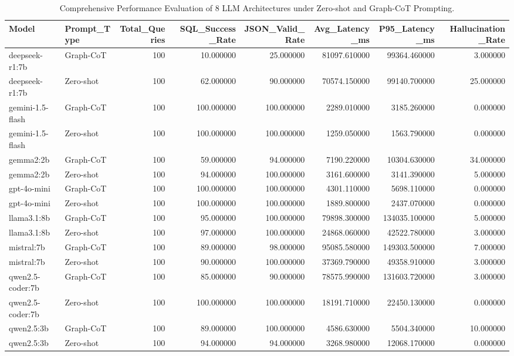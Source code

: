 \begin{table}
\caption{Comprehensive Performance Evaluation of 8 LLM Architectures under Zero-shot and Graph-CoT Prompting.}
\label{tab:llm_benchmark_all}
\begin{tabular}{llrrrrrr}
\toprule
Model & Prompt_Type & Total_Queries & SQL_Success_Rate & JSON_Valid_Rate & Avg_Latency_ms & P95_Latency_ms & Hallucination_Rate \\
\midrule
deepseek-r1:7b & Graph-CoT & 100 & 10.000000 & 25.000000 & 81097.610000 & 99364.460000 & 3.000000 \\
deepseek-r1:7b & Zero-shot & 100 & 62.000000 & 90.000000 & 70574.150000 & 99140.700000 & 25.000000 \\
gemini-1.5-flash & Graph-CoT & 100 & 100.000000 & 100.000000 & 2289.010000 & 3185.260000 & 0.000000 \\
gemini-1.5-flash & Zero-shot & 100 & 100.000000 & 100.000000 & 1259.050000 & 1563.790000 & 0.000000 \\
gemma2:2b & Graph-CoT & 100 & 59.000000 & 94.000000 & 7190.220000 & 10304.630000 & 34.000000 \\
gemma2:2b & Zero-shot & 100 & 94.000000 & 100.000000 & 3161.600000 & 3141.390000 & 5.000000 \\
gpt-4o-mini & Graph-CoT & 100 & 100.000000 & 100.000000 & 4301.110000 & 5698.110000 & 0.000000 \\
gpt-4o-mini & Zero-shot & 100 & 100.000000 & 100.000000 & 1889.800000 & 2437.070000 & 0.000000 \\
llama3.1:8b & Graph-CoT & 100 & 95.000000 & 100.000000 & 79898.300000 & 134035.100000 & 5.000000 \\
llama3.1:8b & Zero-shot & 100 & 97.000000 & 100.000000 & 24868.060000 & 42522.780000 & 3.000000 \\
mistral:7b & Graph-CoT & 100 & 89.000000 & 98.000000 & 95085.580000 & 149303.500000 & 7.000000 \\
mistral:7b & Zero-shot & 100 & 90.000000 & 100.000000 & 37369.790000 & 49358.910000 & 3.000000 \\
qwen2.5-coder:7b & Graph-CoT & 100 & 85.000000 & 90.000000 & 78575.990000 & 131603.720000 & 3.000000 \\
qwen2.5-coder:7b & Zero-shot & 100 & 100.000000 & 100.000000 & 18191.710000 & 22450.130000 & 0.000000 \\
qwen2.5:3b & Graph-CoT & 100 & 89.000000 & 100.000000 & 4586.630000 & 5504.340000 & 10.000000 \\
qwen2.5:3b & Zero-shot & 100 & 94.000000 & 94.000000 & 3268.980000 & 12068.170000 & 0.000000 \\
\bottomrule
\end{tabular}
\end{table}
